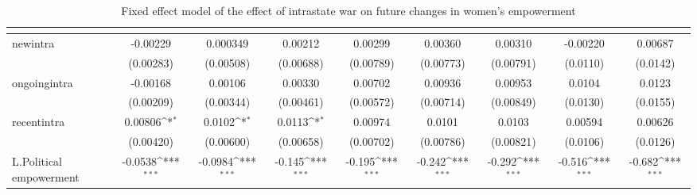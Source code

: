 \begin{table}[htbp]\centering
\def\sym#1{\ifmmode^{#1}\else\(^{#1}\)\fi}
\caption{Fixed effect model of the effect of intrastate war on future changes in women's empowerment\label{intrawarpolempower}}
\begin{tabular}{l*{8}{c}}
\hline\hline
                    &&&&&&&&\\
\hline
newintra            &    -0.00229         &    0.000349         &     0.00212         &     0.00299         &     0.00360         &     0.00310         &    -0.00220         &     0.00687         \\
                    &   (0.00283)         &   (0.00508)         &   (0.00688)         &   (0.00789)         &   (0.00773)         &   (0.00791)         &    (0.0110)         &    (0.0142)         \\
[1em]
ongoingintra        &    -0.00168         &     0.00106         &     0.00330         &     0.00702         &     0.00936         &     0.00953         &      0.0104         &      0.0123         \\
                    &   (0.00209)         &   (0.00344)         &   (0.00461)         &   (0.00572)         &   (0.00714)         &   (0.00849)         &    (0.0130)         &    (0.0155)         \\
[1em]
recentintra         &     0.00806\sym{*}  &      0.0102\sym{*}  &      0.0113\sym{*}  &     0.00974         &      0.0101         &      0.0103         &     0.00594         &     0.00626         \\
                    &   (0.00420)         &   (0.00600)         &   (0.00658)         &   (0.00702)         &   (0.00786)         &   (0.00821)         &    (0.0106)         &    (0.0126)         \\
[1em]
L.Political empowerment&     -0.0538\sym{***}&     -0.0984\sym{***}&      -0.145\sym{***}&      -0.195\sym{***}&      -0.242\sym{***}&      -0.292\sym{***}&      -0.516\sym{***}&      -0.682\sym{***}\\

\end{tabular}
\end{table}
